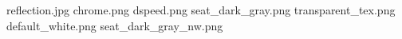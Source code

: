 reflection.jpg
chrome.png
dspeed.png
seat_dark_gray.png
transparent_tex.png
default_white.png
seat_dark_gray_nw.png
